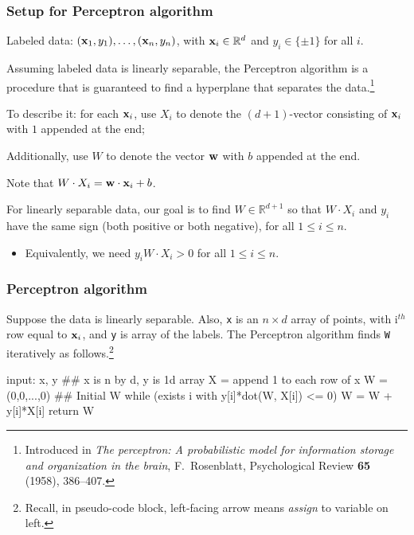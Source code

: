 \documentclass{beamer}
\theoremstyle{example}
\newcommand{\ttt}[1]{{\small\texttt{#1}}}
\begin{document}
\begin{frame}
    \frametitle{Setup for Perceptron algorithm}
    Labeled data: $({\bf x}_1, y_1), \ldots, ({\bf x}_n, y_n)$, with ${\bf x}_i\in\mathbb R^d$ and $y_i\in\{\pm1\}$ for all $i$.

    Assuming labeled data is linearly separable, the Perceptron algorithm is a procedure that is guaranteed to find a hyperplane that separates the data.\footnote{Introduced in \textit{The perceptron: A probabilistic model for information storage and organization in the brain}, F.~Rosenblatt, Psychological Review \textbf{65} (1958), 386{--}407.}
    
    \pause
    To describe it: for each ${\bf x}_i$, use $X_i$ to denote the $(d+1)$-vector consisting of ${\bf x}_i$ with $1$ appended at the end;

    Additionally, use $W$ to denote the vector ${\bf w}$ with $b$ appended at the end.

    \pause
    Note that $W\cdot X_i = {\bf w}\cdot{\bf x}_i + b$. 

    For linearly separable data, our goal is to find $W\in\mathbb R^{d+1}$ so that $W\cdot X_i$ and $y_i$ have the same sign (both positive or both negative), for all $1\le i\le n$.
    \begin{itemize}
        \item Equivalently, we need $y_i W\cdot X_i > 0$ for all $1\le i\le n$.
    \end{itemize}
\end{frame}

\begin{frame}[fragile]
\frametitle{Perceptron algorithm}
Suppose the data is linearly separable. Also, \ttt{x} is an $n\times d$ array of points, with i$^{th}$ row equal to ${\bf x}_i$, and \ttt{y} is array of the labels. The Perceptron algorithm finds \ttt{W} iteratively as follows.\footnote{Recall, in pseudo-code block, left-facing arrow means \textit{assign} to variable on left.}
\pause 

\begin{pseudo}
input: x, y  ## x is n by d, y is 1d array
X = append 1 to each row of x
W = (0,0,...,0)  ## Initial W
while (exists i with y[i]*dot(W, X[i]) <= 0){
    W = W + y[i]*X[i]
}
return W
\end{pseudo}

\end{frame}
\end{document}
